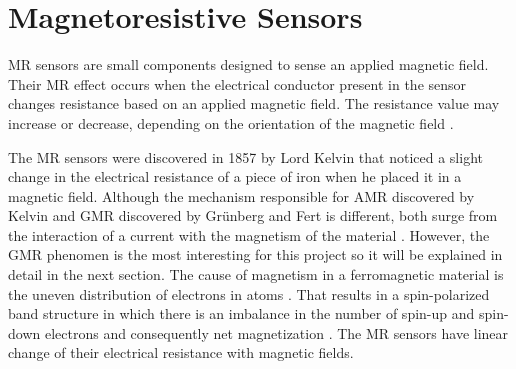 
\label{chapter:state-of-the-art}

\clearpage

\section{Magnetoresistive Sensors}
\label{section:soa-mr-sensors}

\ac{MR} sensors are small components designed to sense an applied magnetic field. Their \ac{MR} effect occurs when the electrical conductor present in the sensor changes resistance based on an applied magnetic field. The resistance value may increase or decrease, depending on the orientation of the magnetic field \cite{Magnetor15:online}.

The \ac{MR} sensors were discovered in 1857 by Lord Kelvin that noticed a slight change in the electrical resistance of a piece of iron when he placed it in a magnetic field. Although the mechanism responsible for \ac{AMR} discovered by Kelvin and \ac{GMR} discovered by Grünberg \cite{PhysRevB.39.4828} and Fert \cite{PhysRevLett.61.2472} is different, both surge from the interaction of a current with the magnetism of the material \cite{Thompson_2008}. However, the \ac{GMR} phenomen is the most interesting for this project so it will be explained in detail in the next section. The cause of magnetism in a ferromagnetic material is the uneven distribution of electrons in atoms \cite{dionne2009magnetic}. That results in a spin-polarized band structure in which there is an imbalance in the number of spin-up and spin-down electrons and consequently net magnetization \cite{Thompson_2008}. The \ac{MR} sensors have linear change of their electrical resistance with magnetic fields.

